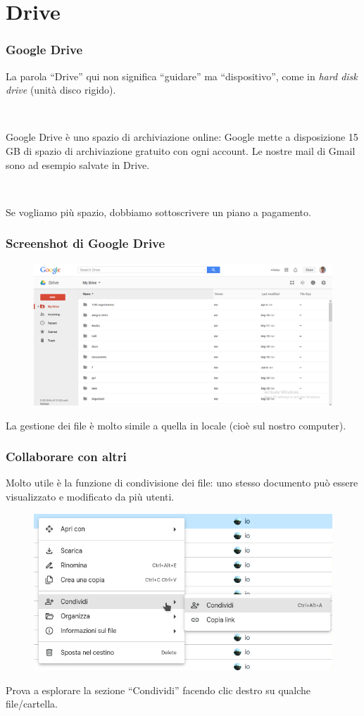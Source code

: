 \documentclass[]{beamer}
\begin{document}
\section{Drive}



\begin{frame}
\frametitle{Google Drive}
La parola ``Drive'' qui non significa ``guidare'' ma ``dispositivo'', come in \emph{hard disk drive} (unità disco rigido).\pause

~

Google Drive è uno \alert{spazio di archiviazione online}: Google mette a disposizione 15 GB di spazio di archiviazione gratuito con ogni account. Le nostre mail di Gmail sono ad esempio salvate in Drive.\pause

~

Se vogliamo più spazio, dobbiamo sottoscrivere un piano a pagamento.
\end{frame}

\begin{frame}
\frametitle{Screenshot di Google Drive}
\begin{figure}
  \includegraphics[width=\columnwidth]{img/drivescreen.png}
\end{figure}

La gestione dei file è molto simile a quella in locale (cioè sul nostro computer).
\end{frame}


\begin{frame}
\frametitle{Collaborare con altri}
Molto utile è la funzione di \alert{condivisione dei file}: uno stesso documento può essere visualizzato e modificato da più utenti.\pause

\begin{figure}
\includegraphics[width=.65\columnwidth]{img/driveshare.png}
\end{figure}

Prova a esplorare la sezione ``Condividi'' facendo clic destro su qualche file/cartella.
\end{frame}
\end{document}
